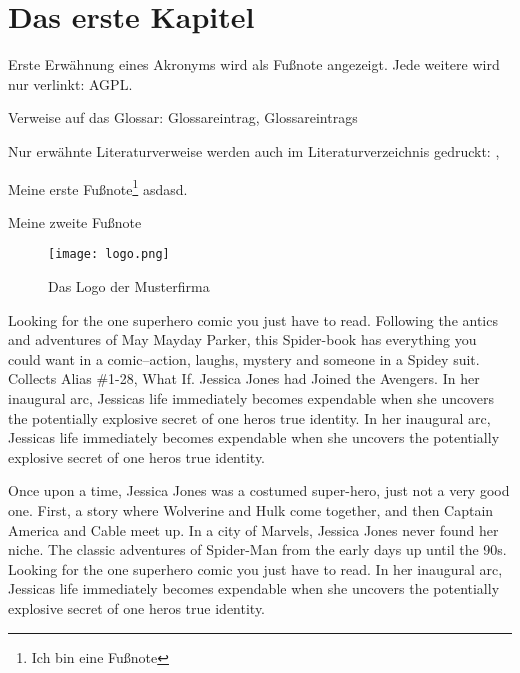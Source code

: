 
\chapter{Das erste Kapitel}
Erste Erwähnung eines Akronyms wird als Fußnote angezeigt. Jede weitere wird
nur verlinkt: \acf{AGPL}. \cite{fsf:2007}

Verweise auf das Glossar: \gls{Glossareintrag}, \glspl{Glossareintrag}

Nur erwähnte Literaturverweise werden auch im Literaturverzeichnis gedruckt:
\cite{baumgartner:2002}, \cite{dreyfus:1980}

Meine erste Fußnote\footnote{Ich bin eine Fußnote} asdasd.

Meine zweite Fußnote\footnotemark

\begin{wrapfigure}{r}{.4\textwidth}
\centering
\texttt{[image: logo.png]}
\vspace{-15pt}
\caption{Das Logo der Musterfirma\footnotemark}
\end{wrapfigure}
Looking for the one superhero comic you just have to read. Following the antics and adventures of May Mayday Parker, this Spider-book has everything you could want in a comic--action, laughs, mystery and someone in a Spidey suit. Collects Alias \#1-28, What If. Jessica Jones had Joined the Avengers. In her inaugural arc, Jessicas life immediately becomes expendable when she uncovers the potentially explosive secret of one heros true identity. In her inaugural arc, Jessicas life immediately becomes expendable when she uncovers the potentially explosive secret of one heros true identity.

Once upon a time, Jessica Jones was a costumed super-hero, just not a very good one. First, a story where Wolverine and Hulk come together, and then Captain America and Cable meet up. In a city of Marvels, Jessica Jones never found her niche. The classic adventures of Spider-Man from the early days up until the 90s. Looking for the one superhero comic you just have to read. In her inaugural arc, Jessicas life immediately becomes expendable when she uncovers the potentially explosive secret of one heros true identity.



